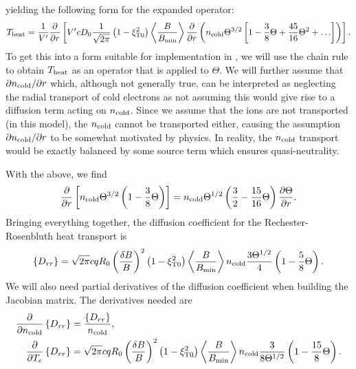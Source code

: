 \documentclass{notes}
\newcommand{\ncold}{n_{\rm cold}}
\newcommand{\Te}{T_e}
\newcommand{\VpVol}{V'}
\begin{document}
    yielding the following form for the expanded operator:
    \begin{equation}
        T_{\rm heat} = \frac{1}{\VpVol}\frac{\partial}{\partial r}\left[
            \VpVol cD_0\frac{1}{\sqrt{2\pi}}\left(1-\xi_{\rm T0}^2\right)\left\langle\frac{B}{B_{\rm min}} \right\rangle
            \frac{\partial}{\partial r}\left( 
                \ncold \Theta^{3/2}\left[ 1 - \frac{3}{8}\Theta + \frac{45}{16}\Theta^2 + \ldots \right]
            \right)
        \right].
    \end{equation}
    To get this into a form suitable for implementation in \DREAM, we will use
    the chain rule to obtain $T_{\rm heat}$ as an operator that is applied to
    $\Theta$. We will further assume that $\partial\ncold/\partial r$ which,
    although not generally true, can be interpreted as neglecting the radial
    transport of cold electrons as not assuming this would give rise to a
    diffusion term acting on $\ncold$. Since we assume that the ions are not
    transported (in this model), the $\ncold$ cannot be transported either,
    causing the assumption $\partial\ncold/\partial r$ to be somewhat motivated
    by physics. In reality, the $\ncold$ transport would be exactly balanced by
    some source term which ensures quasi-neutrality.

    With the above, we find
    \begin{equation}
        \frac{\partial}{\partial r}\left[ \ncold\Theta^{3/2} \left(
            1 - \frac{3}{8}\Theta
        \right)\right] =
        \ncold\Theta^{1/2}\left( \frac{3}{2} - \frac{15}{16}\Theta \right)
        \frac{\partial\Theta}{\partial r}.
    \end{equation}
    Bringing everything together, the diffusion coefficient for the
    Rechester-Rosenbluth heat transport is
    \begin{equation}
        \left\{ D_{rr} \right\} =
        \sqrt{2\pi}cqR_0\left(\frac{\delta B}{B}\right)^2\left(1-\xi_{\rm T0}^2\right)
        \left\langle\frac{B}{B_{\rm min}}\right\rangle\ncold
        \frac{3\Theta^{1/2}}{4}\left( 1 - \frac{5}{8}\Theta \right).
    \end{equation}
    We will also need partial derivatives of the diffusion coefficient when
    building the Jacobian matrix. The derivatives needed are
    \begin{equation}
        \begin{aligned}
            \frac{\partial}{\partial\ncold}\left\{ D_{rr} \right\} &= \frac{\left\{ D_{rr} \right\}}{\ncold},\\
            \frac{\partial}{\partial\Te}\left\{ D_{rr} \right\} &=
                \sqrt{2\pi}cqR_0\left(\frac{\delta B}{B}\right)^2\left(1-\xi_{\rm T0}^2\right)
                \left\langle\frac{B}{B_{\rm min}}\right\rangle\ncold
                \frac{3}{8\Theta^{1/2}}\left( 1 - \frac{15}{8}\Theta \right).
        \end{aligned}
    \end{equation}
\end{document}
